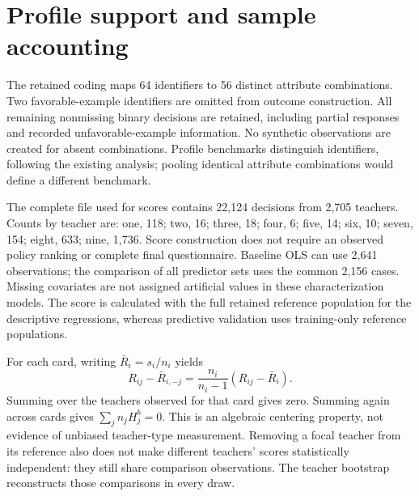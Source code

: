 \section{Profile support and sample accounting}\label{app:support}
\begin{addition}
The retained coding maps 64 identifiers to 56 distinct attribute combinations. Two favorable-example identifiers are omitted from outcome construction. All remaining nonmissing binary decisions are retained, including partial responses and recorded unfavorable-example information. No synthetic observations are created for absent combinations. Profile benchmarks distinguish identifiers, following the existing analysis; pooling identical attribute combinations would define a different benchmark.

The complete file used for scores contains 22,124 decisions from 2,705 teachers. Counts by teacher are: one, 118; two, 16; three, 18; four, 6; five, 14; six, 10; seven, 154; eight, 633; nine, 1,736. Score construction does not require an observed policy ranking or complete final questionnaire. Baseline OLS can use 2,641 observations; the comparison of all predictor sets uses the common 2,156 cases. Missing covariates are not assigned artificial values in these characterization models. The score is calculated with the full retained reference population for the descriptive regressions, whereas predictive validation uses training-only reference populations.

For each card, writing $\bar R_i=s_i/n_i$ yields
\[
R_{ij}-\bar R_{i,-j}=\frac{n_i}{n_i-1}(R_{ij}-\bar R_i).
\]
Summing over the teachers observed for that card gives zero. Summing again across cards gives $\sum_j n_jH^b_j=0$. This is an algebraic centering property, not evidence of unbiased teacher-type measurement. Removing a focal teacher from its reference also does not make different teachers' scores statistically independent: they still share comparison observations. The teacher bootstrap reconstructs those comparisons in every draw.
\end{addition}

